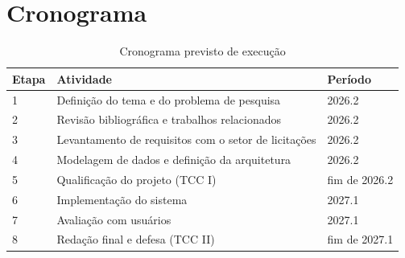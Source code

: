 \section{Cronograma}


\begin{table}[H]
  \centering
  \caption{Cronograma previsto de execução}
  \label{tab:cronograma}
  \begin{ufopaespacosimples}
  \small
  \begin{tabularx}{\textwidth}{@{}lXl@{}}
    \toprule
    \textbf{Etapa} & \textbf{Atividade} & \textbf{Período} \\
    \midrule
    1 & Definição do tema e do problema de pesquisa & 2026.2 \\
    2 & Revisão bibliográfica e trabalhos relacionados & 2026.2 \\
    3 & Levantamento de requisitos com o setor de licitações & 2026.2 \\
    4 & Modelagem de dados e definição da arquitetura & 2026.2 \\
    5 & Qualificação do projeto (TCC I) & fim de 2026.2 \\
    6 & Implementação do sistema & 2027.1 \\
    7 & Avaliação com usuários & 2027.1 \\
    8 & Redação final e defesa (TCC II) & fim de 2027.1 \\
    \bottomrule
  \end{tabularx}
  \end{ufopaespacosimples}
\end{table}
